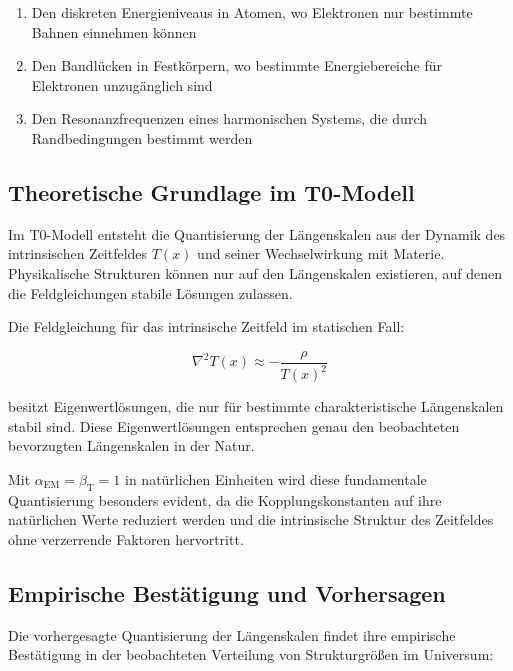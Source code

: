 \documentclass[12pt,a4paper]{article}
\newcommand{\Tfield}{T(x)}
\newcommand{\alphaEM}{\alpha_{\text{EM}}}
\newcommand{\betaT}{\beta_{\text{T}}}
\begin{document}
	\begin{enumerate}
		\item Den diskreten Energieniveaus in Atomen, wo Elektronen nur bestimmte Bahnen einnehmen können
		\item Den Bandlücken in Festkörpern, wo bestimmte Energiebereiche für Elektronen unzugänglich sind
		\item Den Resonanzfrequenzen eines harmonischen Systems, die durch Randbedingungen bestimmt werden
	\end{enumerate}
	
	\subsection{Theoretische Grundlage im T0-Modell}
	
	Im T0-Modell entsteht die Quantisierung der Längenskalen aus der Dynamik des intrinsischen Zeitfeldes $\Tfield$ und seiner Wechselwirkung mit Materie. Physikalische Strukturen können nur auf den Längenskalen existieren, auf denen die Feldgleichungen stabile Lösungen zulassen.
	
	Die Feldgleichung für das intrinsische Zeitfeld im statischen Fall:
	
	\begin{equation}
		\nabla^2\Tfield \approx -\frac{\rho}{\Tfield^2}
	\end{equation}
	
	besitzt Eigenwertlösungen, die nur für bestimmte charakteristische Längenskalen stabil sind. Diese Eigenwertlösungen entsprechen genau den beobachteten bevorzugten Längenskalen in der Natur.
	
	Mit $\alphaEM = \betaT = 1$ in natürlichen Einheiten wird diese fundamentale Quantisierung besonders evident, da die Kopplungskonstanten auf ihre natürlichen Werte reduziert werden und die intrinsische Struktur des Zeitfeldes ohne verzerrende Faktoren hervortritt.
	
	\subsection{Empirische Bestätigung und Vorhersagen}
	
	Die vorhergesagte Quantisierung der Längenskalen findet ihre empirische Bestätigung in der beobachteten Verteilung von Strukturgrößen im Universum:
	
\end{document}
